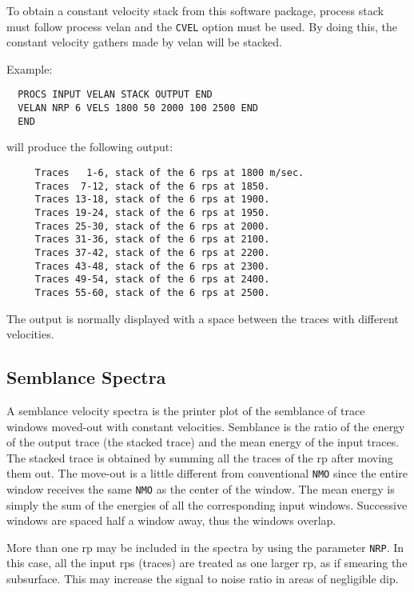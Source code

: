 To obtain a constant velocity stack from this software package, process
stack must follow process velan and the \texttt{CVEL} option must be used. By
doing this, the constant velocity \glspl{gather} made by velan will be stacked.

Example:
\begin{verbatim}
  PROCS INPUT VELAN STACK OUTPUT END
  VELAN NRP 6 VELS 1800 50 2000 100 2500 END
  END
\end{verbatim}

will produce the following output:

\begin{verbatim}
     Traces   1-6, stack of the 6 rps at 1800 m/sec.
     Traces  7-12, stack of the 6 rps at 1850.
     Traces 13-18, stack of the 6 rps at 1900.
     Traces 19-24, stack of the 6 rps at 1950.
     Traces 25-30, stack of the 6 rps at 2000.
     Traces 31-36, stack of the 6 rps at 2100.
     Traces 37-42, stack of the 6 rps at 2200.
     Traces 43-48, stack of the 6 rps at 2300.
     Traces 49-54, stack of the 6 rps at 2400.
     Traces 55-60, stack of the 6 rps at 2500.
\end{verbatim}

The output is normally displayed with a space between the traces with
different velocities.

\subsection{Semblance Spectra}

A semblance velocity spectra is the printer plot of the semblance of
trace windows moved-out with constant velocities.  Semblance is the
ratio of the energy of the output trace (the stacked trace) and the mean
energy of the input traces.  The stacked trace is obtained by summing
all the traces of the \gls{rp} after moving them out. The move-out is a little
different from conventional \texttt{NMO} since the entire window receives the
same \texttt{NMO} as the center of the window.  The mean energy is simply the
sum of the energies of all the corresponding input windows.  Successive
windows are spaced half a window away, thus the windows overlap.

More than one \gls{rp} may be included in the spectra by using the parameter
\texttt{NRP}.  In this case, all the input \glspl{rp} (traces) are treated as one larger
\gls{rp}, as if smearing the subsurface.  This may increase the signal to
noise ratio in areas of negligible dip.


